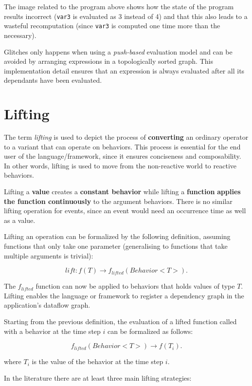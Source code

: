 The image related to the program above shows how the state of the
program results incorrect (\texttt{var3} is evaluated as 3 instead of 4)
and that this also leads to a wasteful recomputation (since
\texttt{var3} is computed one time more than the necessary).

Glitches only happens when using a \emph{push-based} evaluation model
and can be avoided by arranging expressions in a topologically sorted
graph. This implementation detail ensures that an expression is always
evaluated after all its dependants have been evaluated.

\section{Lifting}\label{lifting}

The term \emph{lifting} is used to depict the process of
\textbf{converting} an ordinary operator to a variant that can operate
on behaviors. This process is essential for the end user of the
language/framework, since it ensures conciseness and composability. In
other words, lifting is used to move from the non-reactive world to
reactive behaviors.

Lifting a \textbf{value} creates a \textbf{constant behavior} while
lifting a \textbf{function} \textbf{applies the function continuously}
to the argument behaviors. There is no similar lifting operation for
events, since an event would need an occurrence time as well as a value.

Lifting an operation can be formalized by the following definition,
assuming functions that only take one parameter (generalising to
functions that take multiple arguments is trivial):

\[
lift: f(T)  \rightarrow f_{lifted} (Behavior < T >).
\]

The \(f_{lifted}\) function can now be applied to behaviors that holds
values of type \(T\). Lifting enables the language or framework to
register a dependency graph in the application's dataflow graph.

Starting from the previous definition, the evaluation of a lifted
function called with a behavior at the time step \(i\) can be formalized
as follows:

\[
f_{lifted}(Behavior < T >)  \rightarrow f(T_i) .
\]

where \(T_i\) is the value of the behavior at the time step \(i\).


In the literature there are at least three main lifting strategies:

